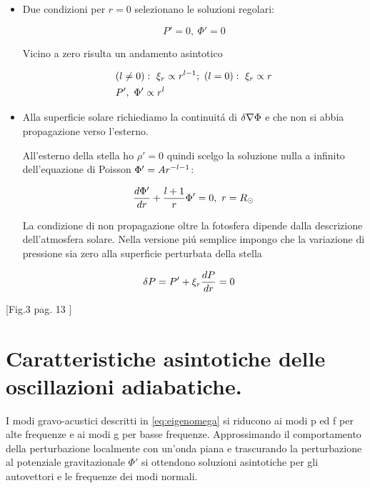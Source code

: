 \documentclass[../main.tex]{subfiles}
\begin{document}
\begin{itemize}
\item Due condizioni per $r=0$ selezionano le soluzioni regolari:

\begin{equation}
P'=0,\ \Phi'=0
\end{equation}

Vicino a zero risulta un andamento asintotico

\begin{align*}
&(l\neq0):\ \xi_r\propto r\expy{l-1};\ (l=0):\ \xi_r\propto r\\
&P',\ \Phi'\propto r^l
\end{align*}

\item Alla superficie solare richiediamo la continuit\'a di $\Lvar{\nabla\Phi}$ e che non si abbia propagazione verso l'esterno.

All'esterno della stella ho $\rho'=0$ quindi scelgo la soluzione nulla a infinito dell'equazione di Poisson $\Phi'=Ar\expy{-l-1}$:

\begin{equation}
\TDy{r}{\Phi'}+\frac{l+1}{r}\Phi'=0,\ r=\rsun{}    
\end{equation}

La condizione di non propagazione oltre la fotosfera dipende dalla descrizione dell'atmosfera solare. Nella versione pi\'u semplice impongo che la variazione di pressione sia zero alla superficie perturbata della stella

\begin{align}
&\Lvar{P}=P'+\xi_r\TDy{r}{P}=0
\end{align}

\end{itemize}

[Fig.3 pag. 13 \cite{chr02helioseismology}]


{\let\clearpage\relax           %
\chapter{Caratteristiche asintotiche delle oscillazioni adiabatiche.}\label{chap:asyntoticbehavour}
}


I modi gravo-acustici descritti in \eqref{eq:eigenomega} si riducono ai modi p ed f per alte frequenze e ai modi g per basse frequenze. Approssimando il comportamento della perturbazione localmente con un'onda piana e trascurando la perturbazione al potenziale gravitazionale $\Phi'$ si ottendono soluzioni asintotiche per gli autovettori e le frequenze dei modi normali.
\end{document}
